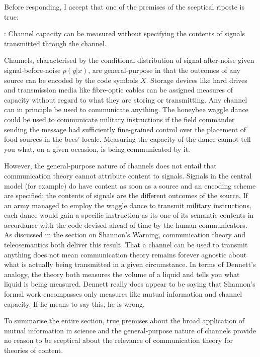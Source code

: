\documentclass[12pt]{article}
\begin{document}
Before responding, I accept that one of the premises of the sceptical riposte is true:

\begin{myquote}
\cia{}: Channel capacity can be measured without specifying the contents of signals transmitted through the channel.
\end{myquote}

\noindent Channels, characterised by the conditional distribution of signal-after-noise given signal-before-noise $p(y|x)$, are general-purpose in that the outcomes of any source can be encoded by the code symbols $X$.
Storage devices like hard drives and transmission media like fibre-optic cables can be assigned measures of capacity without regard to what they are storing or transmitting.
Any channel can in principle be used to communicate anything.
The honeybee waggle dance could be used to communicate military instructions if the field commander sending the message had sufficiently fine-grained control over the placement of food sources in the bees' locale.
Measuring the capacity of the dance cannot tell you what, on a given occasion, is being communicated by it.

However, the general-purpose nature of channels does not entail that communication theory cannot attribute content to signals.
Signals in the central model (for example) do have content as soon as a source and an encoding scheme are specified: the contents of signals are the different outcomes of the source.
If an army managed to employ the waggle dance to transmit military instructions, each dance would gain a specific instruction as its one of its semantic contents in accordance with the code devised ahead of time by the human communicators.
As discussed in the section on Shannon's Warning, communication theory and teleosemantics both deliver this result.
That a channel can be used to transmit anything does not mean communication theory remains forever agnostic about what is actually being transmitted in a given circumstance.
In terms of Dennett's analogy, the theory both measures the volume of a liquid and tells you what liquid is being measured.
Dennett really does appear to be saying that Shannon's formal work encompasses only measures like mutual information and channel capacity.
If he means to say this, he is wrong.

To summarise the entire section, true premises about the broad application of mutual information in science and the general-purpose nature of channels provide no reason to be sceptical about the relevance of communication theory for theories of content.
\end{document}
